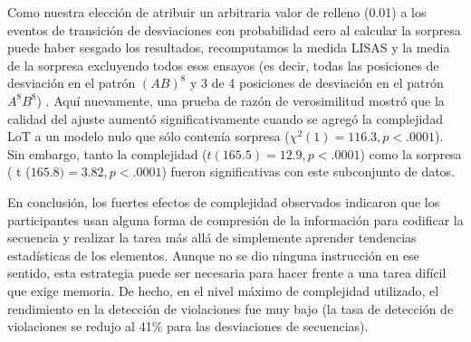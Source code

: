 Como nuestra elección de atribuir un arbitraria valor de relleno (0.01) a los eventos de transición de desviaciones con probabilidad cero al calcular la sorpresa puede haber sesgado los resultados, recomputamos la medida LISAS y la media de la sorpresa excluyendo todos esos ensayos (es decir, todas las posiciones de desviación en el patrón $(AB)^8$ y 3 de 4 posiciones de desviación en el patrón $A^8 B^8$) . Aquí nuevamente, una prueba de razón de verosimilitud mostró que la calidad del ajuste aumentó significativamente cuando se agregó la complejidad LoT a un modelo nulo que sólo contenía sorpresa ($\chi^2(1) = 116.3, p <.0001$). Sin embargo, tanto la complejidad ($t ( 165.5) = 12.9, p <.0001$) como la sorpresa ( t ($165.8) = 3.82, p <.0001$) fueron significativas con este subconjunto de datos. 


En conclusión, los fuertes efectos de complejidad observados indicaron que los participantes usan alguna forma de compresión de la información para codificar la secuencia y realizar la tarea más allá de simplemente aprender tendencias estadísticas de los elementos. Aunque no se dio ninguna instrucción en ese sentido, esta estrategia puede ser necesaria para hacer frente a una tarea difícil que exige memoria. De hecho, en el nivel máximo de complejidad utilizado, el rendimiento en la detección de violaciones fue muy bajo (la tasa de detección de violaciones se redujo al 41\% para las desviaciones de secuencias).


